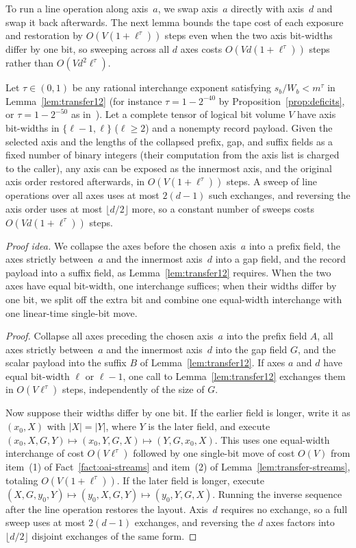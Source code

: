 To run a line operation along axis~$a$, we swap axis~$a$ directly with axis~$d$ and swap it back afterwards. The next
lemma bounds the tape cost of each exposure and restoration by $O(V(1+\ell^\tau))$ steps even when the two axis
bit-widths differ by one bit, so sweeping across all $d$ axes costs $O(Vd(1+\ell^\tau))$ steps rather than
$O(Vd^2\ell^\tau)$.

\begin{lemma}\label{lem:bridge-D}
Let $\tau\in(0,1)$ be any rational interchange exponent satisfying $s_b/W_b<m^\tau$ in Lemma~\ref{lem:transfer12} (for
instance $\tau=1-2^{-40}$ by Proposition~\ref{prop:deficits}, or $\tau=1-2^{-50}$ as in~\cite[Lemma~12]{OAI26}). Let a
complete tensor of logical bit volume $V$ have axis bit-widths in $\{\ell-1,\ell\}$ ($\ell\ge 2$) and a nonempty record
payload. Given the selected axis and the lengths of the collapsed prefix, gap, and suffix fields as a fixed number of
binary integers (their computation from the axis list is charged to the caller), any axis can be exposed as the
innermost axis, and the original axis order restored afterwards, in $O(V(1+\ell^\tau))$ steps. A sweep of line
operations over all axes uses at most $2(d-1)$ such exchanges, and reversing the axis order uses at most
$\lfloor d/2\rfloor$ more, so a constant number of sweeps costs $O(Vd(1+\ell^\tau))$ steps.
\end{lemma}

\emph{Proof idea.} We collapse the axes before the chosen axis~$a$ into a prefix field, the axes strictly between~$a$ and
the innermost axis~$d$ into a gap field, and the record payload into a suffix field, as Lemma~\ref{lem:transfer12}
requires. When the two axes have equal bit-width, one interchange suffices; when their widths differ by one bit, we split
off the extra bit and combine one equal-width interchange with one linear-time single-bit move.

\begin{proof}
Collapse all axes preceding the chosen axis~$a$ into the prefix field $A$, all axes strictly between~$a$ and the
innermost axis~$d$ into the gap field $G$, and the scalar payload into the suffix $B$ of Lemma~\ref{lem:transfer12}. If
axes $a$ and $d$ have equal bit-width $\ell$ or $\ell-1$, one call to Lemma~\ref{lem:transfer12} exchanges them in
$O(V\ell^\tau)$ steps, independently of the size of $G$.

Now suppose their widths differ by one bit. If the earlier field is longer, write it as $(x_0,X)$ with $|X|=|Y|$, where
$Y$ is the later field, and execute $(x_0,X,G,Y)\mapsto(x_0,Y,G,X)\mapsto(Y,G,x_0,X)$. This uses one equal-width
interchange of cost $O(V\ell^\tau)$ followed by one single-bit move of cost $O(V)$ from item~(1) of
Fact~\ref{fact:oai-streams} and item~(2) of Lemma~\ref{lem:transfer-streams}, totaling $O(V(1+\ell^\tau))$. If the later
field is longer, execute $(X,G,y_0,Y)\mapsto(y_0,X,G,Y)\mapsto(y_0,Y,G,X)$. Running the inverse sequence after the line
operation restores the layout. Axis~$d$ requires no exchange, so a full sweep uses at most $2(d-1)$ exchanges, and
reversing the $d$ axes factors into $\lfloor d/2\rfloor$ disjoint exchanges of the same form.
\end{proof}

